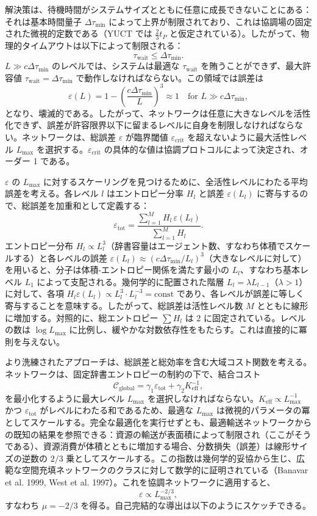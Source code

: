 \documentclass[11pt,a4paper]{article}
\begin{document}
	解決策は、待機時間がシステムサイズとともに任意に成長できないことにある：それは基本時間量子 \(\Delta\tau_{\min}\) によって上界が制限されており、これは協調場の固定された微視的定数である（YUCT では \(\frac23 t_P\) と仮定されている）。したがって、物理的タイムアウトは以下によって制限される：
	\[
	\tau_{\mathrm{wait}} \le \Delta\tau_{\min}.
	\]
	\(L \gg c\Delta\tau_{\min}\) のレベルでは、システムは最適な \(\tau_{\mathrm{wait}}\) を賄うことができず、最大許容値 \(\tau_{\mathrm{wait}} = \Delta\tau_{\min}\) で動作しなければならない。この領域では誤差は
	\[
	\varepsilon(L) = 1 - \left(\frac{c\Delta\tau_{\min}}{L}\right)^3 \approx 1 \quad\text{for } L \gg c\Delta\tau_{\min},
	\]
	となり、壊滅的である。したがって、ネットワークは任意に大きなレベルを活性化できず、誤差が許容限界以下に留まるレベルに自身を制限しなければならない。ネットワークは、総誤差 \(\varepsilon\) が臨界閾値 \(\varepsilon_{\mathrm{crit}}\) を超えないように最大活性レベル \(L_{\max}\) を選択する。\(\varepsilon_{\mathrm{crit}}\) の具体的な値は協調プロトコルによって決定され、オーダー 1 である。
	
	\(\varepsilon\) の \(L_{\max}\) に対するスケーリングを見つけるために、全活性レベルにわたる平均誤差を考える。各レベル \(l\) はエントロピー分率 \(H_l\) と誤差 \(\varepsilon(L_l)\) に寄与するので、総誤差を加重和として定義する：
	\[
	\varepsilon_{\mathrm{tot}} = \frac{\sum_{l=1}^{M} H_l\, \varepsilon(L_l)}{\sum_{l=1}^{M} H_l}.
	\]
	エントロピー分布 \(H_l \propto L_l^3\)（辞書容量はエージェント数、すなわち体積でスケールする）と各レベルの誤差 \(\varepsilon(L_l) \approx (c\Delta\tau_{\min}/L_l)^3\)（大きなレベルに対して）を用いると、分子は体積-エントロピー関係を満たす最小の \(L_l\)、すなわち基本レベル \(L_1\) によって支配される。幾何学的に配置された階層 \(L_l = \lambda L_{l-1}\)（\(\lambda > 1\)）に対して、各項 \(H_l\varepsilon(L_l) \propto L_l^3 \cdot L_l^{-3} = \text{const}\) であり、各レベルが誤差に等しく寄与することを意味する。したがって、総誤差は活性レベル数 \(M\) とともに線形に増加する。対照的に、総エントロピー \(\sum H_l\) は 2 に固定されている。レベルの数は \(\log L_{\max}\) に比例し、緩やかな対数依存性をもたらす。これは直接的に冪則を与えない。
	
	より洗練されたアプローチは、総誤差と総効率を含む大域コスト関数を考える。ネットワークは、固定辞書エントロピーの制約の下で、結合コスト
	\[
	\mathcal{C}_{\mathrm{global}} = \gamma_1 \varepsilon_{\mathrm{tot}} + \gamma_2 K_{\mathrm{eff}}^{-1},
	\]
	を最小化するように最大レベル \(L_{\max}\) を選択しなければならない。\(K_{\mathrm{eff}} \propto L_{\max}^{-1}\) かつ \(\varepsilon_{\mathrm{tot}}\) がレベルにわたる和であるため、最適な \(L_{\max}\) は微視的パラメータの冪としてスケールする。完全な最適化を実行せずとも、最適輸送ネットワークからの既知の結果を参照できる：資源の輸送が表面積によって制限され（ここがそうである）、資源消費が体積とともに増加する場合、分数損失（誤差）は線形サイズの逆数の \(2/3\) 乗としてスケールする。この指数は幾何学的妥協から生じ、広範な空間充填ネットワークのクラスに対して数学的に証明されている（Banavar et al. 1999, West et al. 1997）。これを協調ネットワークに適用すると、
	\[
	\varepsilon \propto L_{\max}^{-2/3},
	\]
	すなわち \(\mu = -2/3\) を得る。自己完結的な導出は以下のようにスケッチできる。
	
\end{document}
